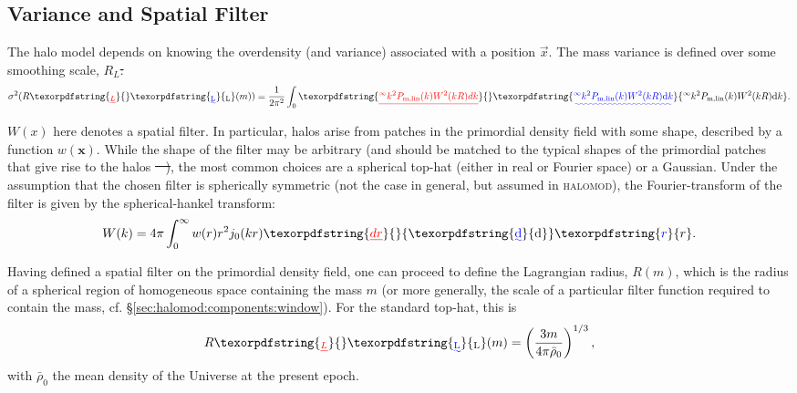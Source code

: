 \documentclass[5p,aas_macros]{elsarticle}
\newcommand{\halomod}{\textsc{halomod}\xspace} %
\providecommand{\DIFaddtex}[1]{{\protect\color{blue}\uwave{#1}}} %
\providecommand{\DIFdeltex}[1]{{\protect\color{red}\sout{#1}}}                      %
\providecommand{\DIFaddbegin}{} %
\providecommand{\DIFaddend}{} %
\providecommand{\DIFdelbegin}{} %
\providecommand{\DIFdelend}{} %
\providecommand{\DIFadd}[1]{\texorpdfstring{\DIFaddtex{#1}}{#1}} %
\providecommand{\DIFdel}[1]{\texorpdfstring{\DIFdeltex{#1}}{}} %
\begin{document}
\subsection{Variance and Spatial Filter}
\label{sec:theory:filter}
The halo model depends on knowing the overdensity (and variance) associated with a position $\vec{x}$. 
The mass variance is defined over some smoothing scale, \DIFdelbegin \DIFdel{$R_L$:
}\DIFdelend \DIFaddbegin \DIFadd{$R_{\rm L}$:
}\DIFaddend \begin{equation}
	\label{eq:massvariance}
	\sigma^2(R\DIFdelbegin \DIFdel{_L}\DIFdelend \DIFaddbegin \DIFadd{_{\rm L}}\DIFaddend (m)) = \frac{1}{2\pi^2}\int_0\DIFdelbegin \DIFdel{^\infty{k^2P_{\rm m, lin}(k)W^2(kR)dk}}\DIFdelend \DIFaddbegin \DIFadd{^\infty{k^2P_{\rm m, lin}(k)W^2(kR){\rm d}k}}\DIFaddend .
\end{equation}
\DIFdelbegin %

\DIFdelend $W(x)$ here denotes a spatial filter.
In particular, halos arise from patches in the primordial density field with some shape, described by a function $w(\mathbf{x})$.
While the shape of the filter may be arbitrary (and should be matched to the typical shapes of the primordial patches that give rise to the halos \DIFdelbegin \DIFdel{\mbox{%
\citep{Dalal2010, Chan2017,Diemer2019}}\hspace{0pt}%
)}\DIFdelend \DIFaddbegin \DIFadd{\mbox{%
\citep{Dalal2010,Chan2017,Diemer2019}}\hspace{0pt}%
}\DIFaddend , the most common choices are a spherical top-hat (either in real or Fourier space) or a Gaussian.
Under the assumption that the chosen filter is spherically symmetric (not the case in general, but assumed in \halomod), the Fourier-transform of the filter is given by the spherical-hankel transform:
\begin{equation}
    W(k) = 4\pi \int_0^\infty w(r) r^2 j_0(kr) \DIFdelbegin \DIFdel{dr}\DIFdelend \DIFaddbegin {\rm \DIFadd{d}}\DIFadd{r}\DIFaddend .
\end{equation}

Having defined a spatial filter on the primordial density field, one can proceed to define the Lagrangian radius, $R(m)$, which is the radius of a spherical region of homogeneous space containing the mass $m$ (or more generally, the scale of a particular filter function required to contain the mass, cf. \S\ref{sec:halomod:components:window}). For the standard top-hat, this is
\begin{equation}
    R\DIFdelbegin \DIFdel{_L}\DIFdelend \DIFaddbegin \DIFadd{_{\rm L}}\DIFaddend (m) = \left(\frac{3m}{4\pi\bar{\rho}_0}\right)^{1 / 3},
\end{equation}
with $\bar{\rho}_0$ the mean density of the Universe at the present epoch.
\end{document}
